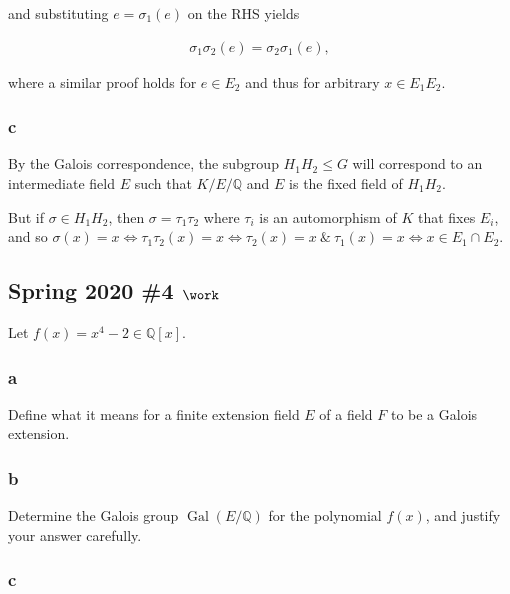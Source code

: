 \begin{solution}
and substituting \(e = \sigma_1(e)\) on the RHS yields

\begin{align*}
\sigma_1 \sigma_2(e) = \sigma_2 \sigma_1(e)
,\end{align*}

where a similar proof holds for \(e\in E_2\) and thus for arbitrary
\(x\in E_1 E_2\).

\hypertarget{c-36}{%
\subsubsection{c}\label{c-36}}

By the Galois correspondence, the subgroup \(H_1H_2 \leq G\) will
correspond to an intermediate field \(E\) such that \(K/E/{\mathbb{Q}}\)
and \(E\) is the fixed field of \(H_1 H_2\).

But if \(\sigma \in H_1 H_2\), then \(\sigma = \tau_1 \tau_2\) where
\(\tau_i\) is an automorphism of \(K\) that fixes \(E_i\), and so
\(\sigma(x) = x \iff \tau_1\tau_2(x) = x \iff \tau_2(x) = x ~\&~ \tau_1(x) = x \iff x \in E_1 \cap E_2\).

\end{solution}

\hypertarget{spring-2020-4-work}{%
\subsection{\texorpdfstring{Spring 2020 \#4
\(\work\)}{Spring 2020 \#4 \textbackslash work}}\label{spring-2020-4-work}}

Let \(f(x) = x^4-2 \in {\mathbb{Q}}[x]\).

\hypertarget{a-63}{%
\subsubsection{a}\label{a-63}}

Define what it means for a finite extension field \(E\) of a field \(F\)
to be a Galois extension.

\hypertarget{b-53}{%
\subsubsection{b}\label{b-53}}

Determine the Galois group \(\operatorname{Gal}(E/{\mathbb{Q}})\) for
the polynomial \(f(x)\), and justify your answer carefully.

\hypertarget{c-37}{%
\subsubsection{c}\label{c-37}}

